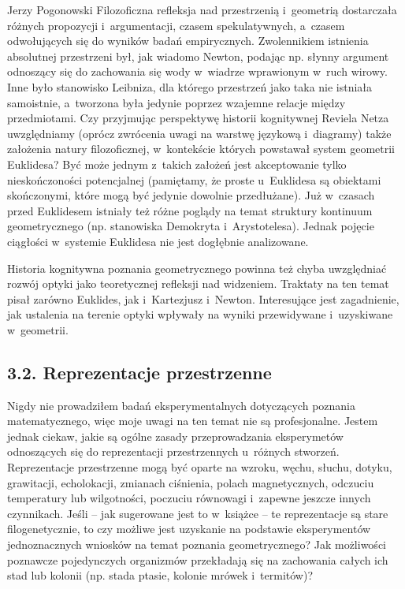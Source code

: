 \begin{newrevplenv}{Jerzy Pogonowski}
Filozoficzna refleksja nad przestrzenią i~geometrią dostarczała
różnych propozycji i~argumentacji, czasem spekulatywnych, a~czasem
odwołujących się do wyników badań empirycznych. Zwolennikiem
istnienia absolutnej przestrzeni był, jak wiadomo Newton, podając
np. słynny argument odnoszący się do zachowania się wody w~wiadrze
wprawionym w~ruch wirowy. Inne było stanowisko Leibniza, dla
którego przestrzeń jako taka nie istniała samoistnie, a~tworzona
była jedynie poprzez wzajemne relacje między przedmiotami. Czy
przyjmując perspektywę historii kognitywnej Reviela Netza
uwzględniamy (oprócz zwrócenia uwagi na warstwę językową i~diagramy) także założenia natury filozoficznej, w~kontekście
których powstawał system geometrii Euklidesa? Być może jednym z~takich założeń jest akceptowanie tylko nieskończoności
potencjalnej (pamiętamy, że proste u~Euklidesa są obiektami
skończonymi, które mogą być jedynie dowolnie przedłużane). Już w~czasach przed Euklidesem istniały też różne poglądy na temat
struktury kontinuum geometrycznego (np. stanowiska Demokryta i~Arystotelesa). Jednak pojęcie ciągłości w~systemie Euklidesa nie
jest dogłębnie analizowane.

Historia kognitywna poznania geometrycznego powinna też chyba
uwzględniać rozwój optyki jako teoretycznej refleksji nad
widzeniem. Traktaty na ten temat pisał zarówno Euklides, jak i~Kartezjusz i~Newton. Interesujące jest zagadnienie, jak ustalenia
na terenie optyki wpływały na wyniki przewidywane i~uzyskiwane w~geometrii.

\subsection{3.2. Reprezentacje przestrzenne}

Nigdy nie prowadziłem badań eksperymentalnych dotyczących poznania
matematycznego, więc moje uwagi na ten temat nie są profesjonalne.
Jestem jednak ciekaw, jakie są ogólne zasady przeprowadzania
eksperymetów odnoszących się do reprezentacji przestrzennych u~różnych stworzeń. Reprezentacje przestrzenne mogą być oparte na
wzroku, węchu, słuchu, dotyku, grawitacji, echolokacji, zmianach
ciśnienia, polach magnetycznych, odczuciu temperatury lub
wilgotności, poczuciu równowagi i~zapewne jeszcze innych
czynnikach. Jeśli -- jak sugerowane jest to w~książce -- te
reprezentacje są stare filogenetycznie, to czy możliwe jest
uzyskanie na podstawie eksperymentów jednoznacznych wniosków na
temat poznania geometrycznego? Jak możliwości poznawcze
pojedynczych organizmów przekładają się na zachowania całych ich
stad lub kolonii (np. stada ptasie, kolonie mrówek i~termitów)?


\end{newrevplenv}
